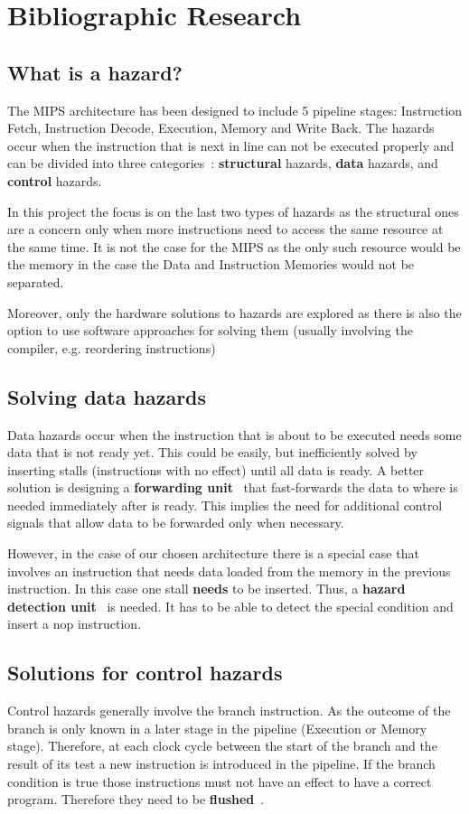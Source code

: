\documentclass[a4paper,12pt]{report}
\begin{document}
\chapter{Bibliographic Research}
\section{What is a hazard?}
The MIPS architecture has been designed to include 5 pipeline stages: Instruction Fetch, Instruction Decode, Execution, Memory and Write Back. The hazards occur when the instruction that is next in line can not be executed properly and can be divided into three categories~\cite{patterson2014computer}: \textbf{structural} hazards, \textbf{data} hazards, and \textbf{control} hazards.

In this project the focus is on the last two types of hazards as the structural ones are a concern only when more instructions need to access the same resource at the same time. It is not the case for the MIPS as the only such resource would be the memory in the case the Data and Instruction Memories would not be separated. 

Moreover, only the hardware solutions to hazards are explored as there is also the option to use software approaches for solving them (usually involving the compiler, e.g. reordering instructions)

\section{Solving data hazards}
Data hazards occur when the instruction that is about to be executed needs some data that is not ready yet. This could be easily, but inefficiently solved by inserting stalls (instructions with no effect) until all data is ready. A better solution is designing a \textbf{forwarding unit}~\cite{patterson2014computer} that fast-forwards the data to where is needed immediately after is ready. This implies the need for additional control signals that allow data to be forwarded only when necessary.

However, in the case of our chosen architecture there is a special case that involves an instruction that needs data loaded from the memory in the previous instruction. In this case one stall \textbf{needs} to be inserted. Thus, a \textbf{hazard detection unit}~\cite{patterson2014computer} is needed. It has to be able to detect the special condition and insert a nop instruction.

\section{Solutions for control hazards}
Control hazards generally involve the branch instruction. As the outcome of the branch is only known in a later stage in the pipeline (Execution or Memory stage). Therefore, at each clock cycle between the start of the branch and the result of its test a new instruction is introduced in the pipeline. If the branch condition is true those instructions must not have an effect to have a correct program. Therefore they need to be \textbf{flushed}~\cite{patterson2014computer}. \\
\end{document}
